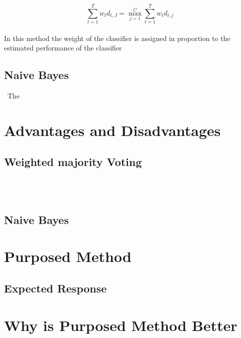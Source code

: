 \documentclass{article}
\begin{document}
$$\displaystyle\sum_{t=1}^{T}w_{t}d_{t,J}=\displaystyle\mathop{\max}_{j=1}^{C}\displaystyle\sum_{t=1}^{T}w_{t}d_{t,j}$$
\\
In this method the weight of the classifier is assigned in proportion to the estimated performance of the classifier
\subsection{Naive Bayes}\
The 


\section{Advantages and Disadvantages}
\subsection{Weighted majority Voting}\label{SEC:Enviro}
\\
\\

\subsection{Naive Bayes}\label{sec:Social}


\section{Purposed Method}
\subsection{Expected Response}\label{sec:EXPECTED}


        
\section{Why is Purposed Method Better}\label{conclusion}
\pagebreak
\end{document}
